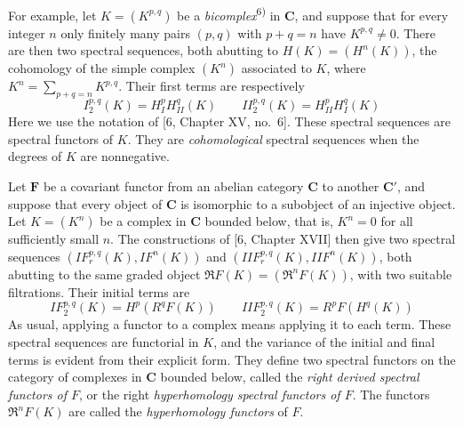 
For example, let $K=(K^{p,q})$ be a \textit{bicomplex}\textsuperscript{6)} in $\mathbf{C}$, and suppose that for every
integer $n$ only finitely many pairs $(p,q)$ with $p+q=n$ have
$K^{p,q}\ne0$. There are then two spectral sequences, both abutting to
$H(K)=(H^n(K))$, the cohomology of the simple complex $(K^n)$ associated to
$K$, where $K^n=\displaystyle\sum_{p+q=n}K^{p,q}$. Their first terms are respectively
\[
\tag{2.4.1}
I_2^{p,q}(K)=H_{I}^pH_{II}^q(K)
\qquad
II_2^{p,q}(K)=H_{II}^pH_{I}^q(K)
\]
Here we use the notation of [6, Chapter XV, no.~6]. These spectral sequences
are spectral functors of $K$. They are \textit{cohomological} spectral sequences when
the degrees of $K$ are nonnegative.

Let $\mathbf{F}$ be a covariant functor from an abelian category $\mathbf{C}$ to another $\mathbf{C}'$,
and suppose that every object of $\mathbf{C}$ is isomorphic to a subobject of an
injective object. Let $K=(K^n)$ be a complex in $\mathbf{C}$ bounded below, that is,
$K^n=0$ for all sufficiently small $n$. The constructions of [6, Chapter XVII]
then give two spectral sequences
$(IF_r^{p,q}(K),IF^n(K))$ and
$(IIF_r^{p,q}(K),IIF^n(K))$, both abutting to the
same graded object $\mathfrak R F(K)=(\mathfrak R^nF(K))$, with two suitable
filtrations. Their initial terms are
\[
\tag{2.4.2}
IF_2^{p,q}(K)=H^p(R^qF(K))
\qquad
IIF_2^{p,q}(K)=R^pF(H^q(K))
\]
As usual, applying a functor to a complex means applying it to each term.
These spectral sequences are functorial in $K$, and the variance of the
initial and final terms is evident from their explicit form. They define two
spectral functors on the category of complexes in $\mathbf{C}$ bounded below, called
the \textit{right derived spectral functors of $F$}, or the right
\textit{hyperhomology spectral functors of $F$}. The functors
$\mathfrak R^nF(K)$ are called the \textit{hyperhomology functors} of $F$.

